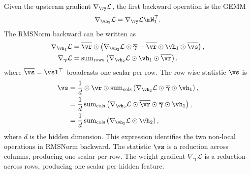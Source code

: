 Given the upstream gradient $\nabla_{\vy}\mathcal{L}$, the first backward operation is the GEMM
\begin{align*}
\nabla_{\vh_2}\mathcal{L}
=
\nabla_{\vy}\mathcal{L}\mW_1^\top .
\end{align*}
The RMSNorm backward can be written as
\begin{align*}
\nabla_{\vh_1}\mathcal{L}
&=
\overline{\vr} \odot
\left(
\nabla_{\vh_2}\mathcal{L} \odot \overline{\boldsymbol{\gamma}}
-
\overline{\vr} \odot \vh_1 \odot \overline{\vs}
\right), \\
\nabla_{\boldsymbol{\gamma}}\mathcal{L}
&=
\operatorname{sum}_{\mathrm{rows}}
\left(
\nabla_{\vh_2}\mathcal{L}
\odot \vh_1
\odot \overline{\vr}
\right),
\end{align*}
where $\overline{\vs} = \vs \mathbf{1}^{\top}$ broadcasts one scalar per row. The row-wise statistic $\vs$ is
\begin{align*}
\vs
&=
\frac{1}{d}
\odot \vr \odot
\operatorname{sum}_{\mathrm{cols}}
\left(
\nabla_{\vh_2}\mathcal{L} \odot \overline{\boldsymbol{\gamma}} \odot \vh_1
\right), \\
&=
\frac{1}{d}
\operatorname{sum}_{\mathrm{cols}}
\left(
\nabla_{\vh_2}\mathcal{L} \odot \overline{\vr} \odot \overline{\boldsymbol{\gamma}} \odot \vh_1
\right), \\
&=
\frac{1}{d}
\operatorname{sum}_{\mathrm{cols}}
\left(
\nabla_{\vh_2}\mathcal{L} \odot \vh_2
\right),
\end{align*}
where $d$ is the hidden dimension. This expression identifies the two non-local operations in RMSNorm backward. The statistic $\vs$ is a reduction across columns, producing one scalar per row. The weight gradient $\nabla_{\boldsymbol{\gamma}}\mathcal{L}$ is a reduction across rows, producing one scalar per hidden feature.

